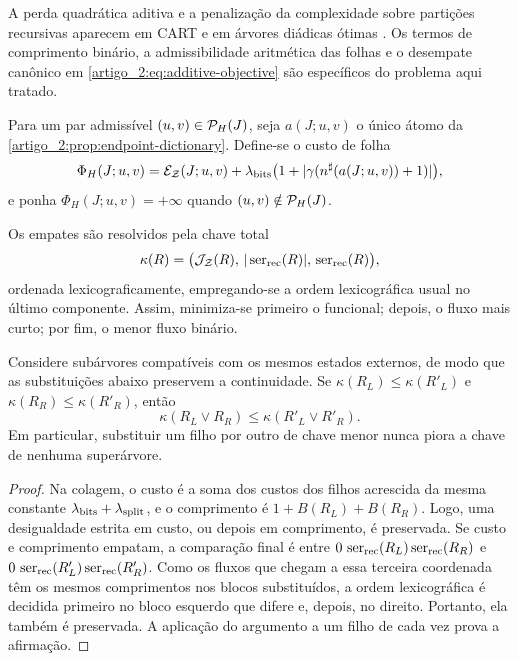 A perda quadrática aditiva e a penalização da complexidade sobre partições
recursivas aparecem em CART e em árvores diádicas ótimas
\citep{artigo_2-breiman1984,artigo_2-donoho1997,artigo_2-blanchard2007}. Os termos de comprimento binário,
a admissibilidade aritmética das folhas e o desempate canônico em
\eqref{artigo_2:eq:additive-objective} são específicos do problema aqui tratado.

Para um par admissível $(u,v)\in\mathcal{P}_H(J)$, seja $a(J;u,v)$ o único átomo
da \cref{artigo_2:prop:endpoint-dictionary}. Define-se o custo de folha
\begin{equation}
 \Phi_H(J;u,v)=
 \mathcal{E}_{\mathcal Z}(J;u,v)
 +\lambda_{\rm bits}
  \bigl(1+|\gamma(n^\sharp(a(J;u,v))+1)|\bigr),
 \label{artigo_2:eq:leaf-cost}
\end{equation}
e ponha $\Phi_H(J;u,v)=+\infty$ quando $(u,v)\notin\mathcal{P}_H(J)$.

Os empates são resolvidos pela chave total
\begin{equation}
 \kappa(R)=
 \bigl(\mathcal{J}_{\mathcal Z}(R),\,
       |\operatorname{ser}_{\rm rec}(R)|,\,
       \operatorname{ser}_{\rm rec}(R)\bigr),
 \label{artigo_2:eq:tie-key}
\end{equation}
ordenada lexicograficamente, empregando-se a ordem lexicográfica usual no último
componente. Assim, minimiza-se primeiro o funcional; depois, o fluxo mais
curto; por fim, o menor fluxo binário.

\begin{lemma}\label{map:artigo_2:5.2}
\label{artigo_2:lem:tie-concatenation}
Considere subárvores compatíveis com os mesmos estados externos, de modo que
as substituições abaixo preservem a continuidade. Se
$\kappa(R_L)\le\kappa(R'_L)$ e $\kappa(R_R)\le\kappa(R'_R)$, então
\[
 \kappa(R_L\vee R_R)\le\kappa(R'_L\vee R'_R).
\]
Em particular, substituir um filho por outro de chave menor nunca piora a
chave de nenhuma superárvore.
\end{lemma}

\begin{proof}
Na colagem, o custo é a soma dos custos dos filhos acrescida da mesma constante
$\lambda_{\rm bits}+\lambda_{\rm split}$, e o comprimento é
$1+B(R_L)+B(R_R)$. Logo, uma desigualdade estrita em custo, ou depois em
comprimento, é preservada. Se custo e comprimento empatam, a comparação final
é entre
$0\,\operatorname{ser}_{\rm rec}(R_L)\operatorname{ser}_{\rm rec}(R_R)$ e
$0\,\operatorname{ser}_{\rm rec}(R'_L)\operatorname{ser}_{\rm rec}(R'_R)$. Como os fluxos que chegam a essa
terceira coordenada têm os mesmos comprimentos nos blocos substituídos, a
ordem lexicográfica é decidida primeiro no bloco esquerdo que difere e, depois,
no direito. Portanto, ela também é preservada. A aplicação do argumento a um filho
de cada vez prova a afirmação.
\end{proof}

